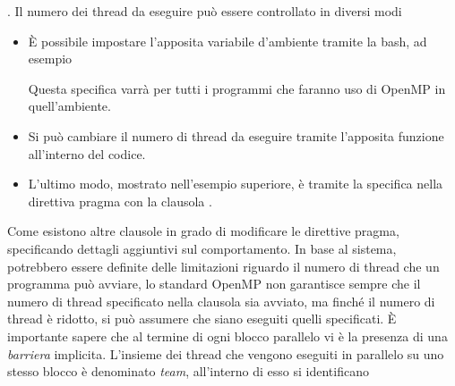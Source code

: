 \documentclass[10pt, letterpaper]{report}
\begin{document}
.\acc 
Il numero dei thread da eseguire può essere controllato in diversi modi\begin{itemize}
    \item È possibile impostare l'apposita variabile d'ambiente  tramite la bash, ad esempio \begin{center}
    \end{center}
    Questa specifica varrà per tutti i programmi che faranno uso di OpenMP in quell'ambiente.
    \item Si può cambiare il numero di thread da eseguire tramite l'apposita funzione  all'interno del codice. 
    \item L'ultimo modo, mostrato nell'esempio superiore, è tramite la specifica nella direttiva pragma con la clausola .
\end{itemize}
Come  esistono altre clausole in grado di modificare le direttive pragma, specificando dettagli aggiuntivi sul comportamento.\acc 
In base al sistema, potrebbero essere definite delle limitazioni riguardo il numero di thread che un programma può avviare, lo standard OpenMP non garantisce sempre che il numero di thread specificato nella clausola sia avviato, ma finché il numero di thread è ridotto, si può assumere che siano eseguiti quelli specificati. È importante sapere che al termine di ogni blocco parallelo vi è la presenza di una \textit{barriera} implicita.\acc 
L'insieme dei thread che vengono eseguiti in parallelo su uno stesso blocco è denominato \textit{team}, all'interno di esso si identificano
\end{document}
